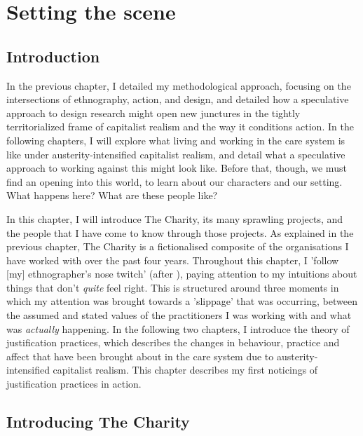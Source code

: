 \chapter{Setting the scene}
\label{4}

\section{Introduction}
\label{4-intro}

In the previous chapter, I detailed my methodological approach, focusing on the intersections of ethnography, action, and design, and detailed how a speculative approach to design research might open new junctures in the tightly territorialized frame of capitalist realism and the way it conditions action. In the following chapters, I will explore what living and working in the care system is like under austerity-intensified capitalist realism, and detail what a speculative approach to working against this might look like. Before that, though, we must find an opening into this world, to learn about our characters and our setting. What happens here? What are these people like? 

In this chapter, I will introduce The Charity, its many sprawling projects, and the people that I have come to know through those projects. As explained in the previous chapter, The Charity is a fictionalised composite of the organisations I have worked with over the past four years. Throughout this chapter, I 'follow [my] ethnographer’s nose twitch' (after \cite{leigh_star_this_2010}), paying attention to my intuitions about things that don’t \textit{quite} feel right. This is structured around three moments in which my attention was brought towards a 'slippage' \citep{cutting_making_2021} that was occurring, between the assumed and stated values of the practitioners I was working with and what was \textit{actually} happening. In the following two chapters, I introduce the theory of justification practices, which describes the  changes in behaviour, practice and affect that have been brought about in the care system due to austerity-intensified capitalist realism. This chapter describes my first noticings of justification practices in action.

\section{Introducing The Charity}

